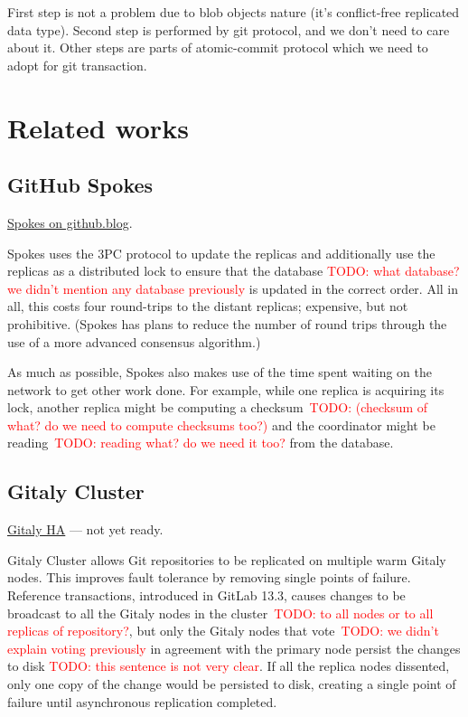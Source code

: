 \documentclass[acmlarge, screen, nonacm]{acmart}
\newcommand{\todo}[1]{\textcolor{red}{TODO: #1}}
\begin{document}
First step is not a problem due to blob objects nature (it's conflict-free replicated data type).
Second step is performed by git protocol, and we don't need to care about it.
Other steps are parts of atomic-commit protocol which we need to adopt for git transaction.

\section{Related works}

\subsection{GitHub Spokes}

\href{https://github.blog/2017-10-13-stretching-spokes/}{Spokes on github.blog}.

Spokes uses the 3PC protocol to update the replicas and additionally use the replicas as a distributed lock
to ensure that the database \todo{what database? we didn't mention any database previously} is updated in the correct order.
All in all, this costs four round-trips to the distant replicas;
expensive, but not prohibitive.
(Spokes has plans to reduce the number of round trips through the use of a more advanced consensus algorithm.)

As much as possible, Spokes also makes use of the time spent waiting on the network to get other work done.
For example, while one replica is acquiring its lock,
another replica might be computing a checksum~\todo{(checksum of what? do we need to compute checksums too?)}
and the coordinator might be reading~\todo{reading what? do we need it too?} from the database.


\subsection{Gitaly Cluster}

\href{https://gitlab.com/groups/gitlab-org/-/epics/1189}{Gitaly HA} --- not yet ready.

Gitaly Cluster allows Git repositories to be replicated on multiple warm Gitaly nodes.
This improves fault tolerance by removing single points of failure.
Reference transactions, introduced in GitLab 13.3,
causes changes to be broadcast to all the Gitaly nodes in the cluster~\todo{to all nodes or to all replicas of repository?},
but only the Gitaly nodes that vote~\todo{we didn't explain voting previously} in agreement with the primary node persist the changes to disk \todo{this sentence is not very clear}.
If all the replica nodes dissented, only one copy of the change would be persisted to disk,
creating a single point of failure until asynchronous replication completed.
\end{document}

